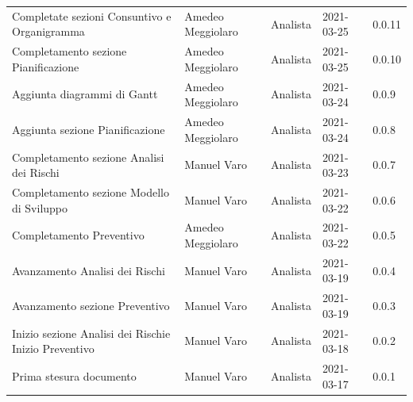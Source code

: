 \documentclass[a4paper]{article}
\begin{document}
\begin{center}
\begin{table}[h!]
\begin{tabular}{p{160px} p{90px} p{70px} p{55px} p{45px}}
        Completate sezioni Consuntivo e Organigramma                  & Amedeo Meggiolaro & Analista       & 2021-03-25    & 0.0.11            \\
        Completamento sezione Pianificazione                          & Amedeo Meggiolaro & Analista       & 2021-03-25    & 0.0.10            \\
        Aggiunta diagrammi di Gantt                                   & Amedeo Meggiolaro & Analista       & 2021-03-24    & 0.0.9             \\
        Aggiunta sezione Pianificazione                               & Amedeo Meggiolaro & Analista       & 2021-03-24    & 0.0.8             \\
        Completamento sezione Analisi dei Rischi                      & Manuel Varo       & Analista       & 2021-03-23    & 0.0.7             \\
        Completamento sezione Modello di Sviluppo                     & Manuel Varo       & Analista       & 2021-03-22    & 0.0.6             \\
        Completamento Preventivo                                      & Amedeo Meggiolaro & Analista       & 2021-03-22    & 0.0.5             \\
        Avanzamento Analisi dei Rischi                                & Manuel Varo       & Analista       & 2021-03-19    & 0.0.4             \\
        Avanzamento sezione Preventivo                                & Manuel Varo       & Analista       & 2021-03-19    & 0.0.3             \\
        Inizio sezione Analisi dei Rischi\newline e Inizio Preventivo & Manuel Varo       & Analista       & 2021-03-18    & 0.0.2             \\
        Prima stesura documento                                       & Manuel Varo       & Analista       & 2021-03-17    & 0.0.1             \\
    \end{tabular}
\end{table}

\end{center}

\newpage
\tableofcontents
\newpage
\newpage
\listoffigures
\newpage
\newpage
\listoftables
\newpage






\appendix


\end{document}
